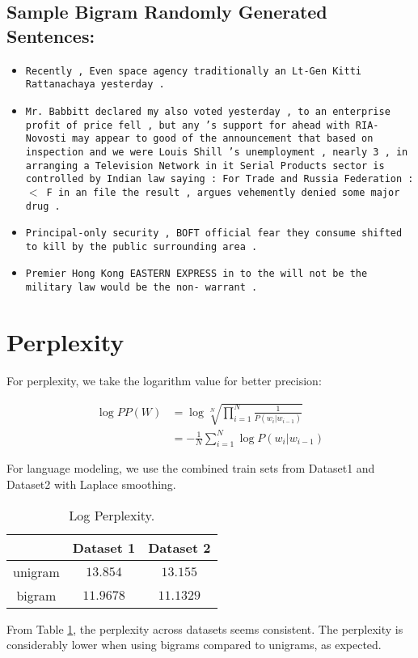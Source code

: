\documentclass[12pt]{article}
\begin{document}
\subsection{Sample Bigram Randomly Generated Sentences:}

\begin{itemize}
\item \texttt{Recently , Even space agency traditionally an Lt-Gen Kitti Rattanachaya yesterday .}

\item \texttt{Mr. Babbitt declared my also voted yesterday , to an enterprise profit of price fell , but any 's support for ahead with RIA-Novosti may appear to good of the announcement that based on inspection and we were Louis Shill 's unemployment , nearly 3 , in arranging a Television Network in it Serial Products sector is controlled by Indian law saying : For Trade and Russia Federation : $<$ F in an file the result , argues vehemently denied some major drug .}

\item \texttt{Principal-only security , BOFT official fear they consume shifted to kill by the public surrounding area .}

\item \texttt{Premier Hong Kong EASTERN EXPRESS in to the will not be the military law would be the non- warrant .}

\end{itemize}

\section{Perplexity}

For perplexity, we take the logarithm value for better precision:

\begin{align*}
\log PP(W) &= \log \sqrt[N]{\prod_{i=1}^{N}\frac{1}{P(w_i | w_{i-1})}}\\
    &=-\frac{1}{N}\sum_{i=1}^{N}\log P(w_i | w_{i-1})
\end{align*}

For language modeling, we use the combined train sets from Dataset1 and
Dataset2 with Laplace smoothing.

\begin{table}[htb]
\begin{center}
\begin{tabular}{|c|c|c|}
\hline
&Dataset 1 & Dataset 2\\
\hline
unigram & $13.854$ & $13.155$\\
\hline
bigram & $11.9678$ & $11.1329$\\
\hline
\end{tabular}
\end{center}
\caption{\label{table:perplexity} Log Perplexity.}
\end{table}
From Table \ref{table:perplexity}, the perplexity across datasets seems
consistent. The perplexity is considerably lower when using bigrams compared
to unigrams, as expected.
\end{document}
